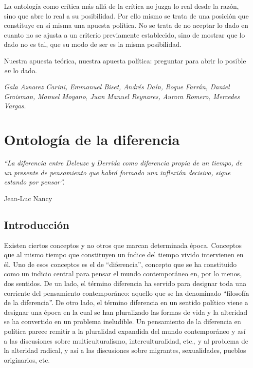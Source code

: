La ontología como crítica más allá de la crítica no juzga lo real desde la razón, sino que abre lo real a su posibilidad. Por ello mismo se trata de una posición que constituye en sí misma una apuesta política. No se trata de no aceptar lo dado en cuanto no se ajusta a un criterio previamente establecido, sino de mostrar que lo dado no es tal, que su modo de ser es la misma posibilidad.

Nuestra apuesta teórica, nuestra apuesta política: preguntar para abrir lo posible \emph{en} lo dado.

\emph{Gala Aznarez Carini, Emmanuel Biset, Andrés Daín, Roque Farrán, Daniel Groisman, Manuel Moyano, Juan Manuel Reynares, Aurora Romero, Mercedes Vargas.}

\mainmatter

\chapter{Ontología de la diferencia}
\sectionmark{ } %

\epigraph{\emph{\enquote{La diferencia entre Deleuze y Derrida como diferencia propia  de un tiempo, de un presente de pensamiento que habrá formado una inflexión decisiva, sigue estando por pensar}.}}{Jean-Luc Nancy}

\section{Introducción}

Existen ciertos conceptos y no otros que marcan determinada época. Conceptos que al mismo tiempo que constituyen un índice del tiempo vivido intervienen en él. Uno de esos conceptos es el de \enquote{diferencia}, concepto que se ha constituido como un indicio central para pensar el mundo contemporáneo en, por lo menos, dos sentidos. De un lado, el término diferencia ha servido para designar toda una corriente del pensamiento contemporáneo: aquello que se ha denominado \enquote{filosofía de la diferencia}. De otro lado, el término diferencia en un sentido político viene a designar una época en la cual se han pluralizado las formas de vida y la alteridad se ha convertido en un problema ineludible. Un pensamiento de la diferencia en política parece remitir a la pluralidad expandida del mundo contemporáneo y así a las discusiones sobre multiculturalismo, interculturalidad, etc., y al problema de la alteridad radical, y así a las discusiones sobre migrantes, sexualidades, pueblos originarios, etc.

